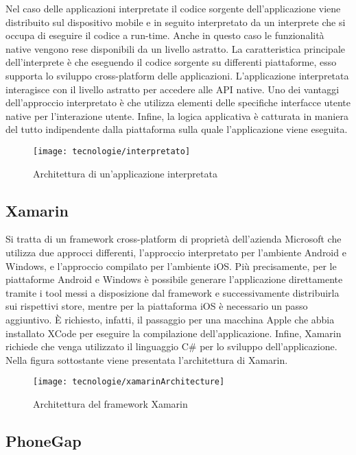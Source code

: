 Nel caso delle applicazioni interpretate il codice sorgente dell'applicazione viene distribuito sul dispositivo mobile e in seguito interpretato da un interprete che si occupa di eseguire il codice a run-time. Anche in questo caso le funzionalità native vengono rese disponibili da un livello astratto. La caratteristica principale dell'interprete è che eseguendo il codice sorgente su differenti piattaforme, esso supporta lo sviluppo cross-platform delle applicazioni. L'applicazione interpretata interagisce con il livello astratto per accedere alle API native. Uno dei vantaggi dell'approccio interpretato è che utilizza elementi delle specifiche interfacce utente native per l'interazione utente. Infine, la logica applicativa è catturata in maniera del tutto indipendente dalla piattaforma sulla quale l'applicazione viene eseguita.

\begin{figure}[!h] 
    \centering 
    \texttt{[image: tecnologie/interpretato]} 
    \caption{Architettura di un'applicazione interpretata}
\end{figure}

\newpage

\subsection{Xamarin}

Si tratta di un framework cross-platform di proprietà dell'azienda Microsoft che utilizza due approcci differenti, l'approccio interpretato per l'ambiente Android e Windows, e l'approccio compilato per l'ambiente iOS. Più precisamente, per le piattaforme Android e Windows è possibile generare l'applicazione direttamente tramite i tool messi a disposizione dal framework e successivamente distribuirla sui rispettivi store, mentre per la piattaforma iOS è necessario un passo aggiuntivo. È richiesto, infatti, il passaggio per una macchina Apple che abbia installato XCode per eseguire la compilazione dell'applicazione. Infine, Xamarin richiede che venga utilizzato il linguaggio C\# per lo sviluppo dell'applicazione. Nella figura sottostante viene presentata l'architettura di Xamarin.

\begin{figure}[!h] 
    \centering 
    \texttt{[image: tecnologie/xamarinArchitecture]} 
    \caption{Architettura del framework Xamarin}
\end{figure}

\subsection{PhoneGap}

